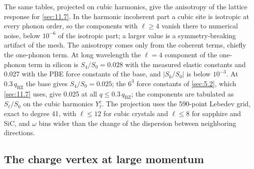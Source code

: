 The same tables, projected on cubic harmonics, give the anisotropy of the lattice response for \cref{sec:11.7}. In the harmonic incoherent part a cubic site is isotropic at every phonon order, so the components with $\ell \ge 4$ vanish there to numerical noise, below $10^{-6}$ of the isotropic part; a larger value is a symmetry-breaking artifact of the mesh. The anisotropy comes only from the coherent terms, chiefly the one-phonon term. At long wavelength the $\ell = 4$ component of the one-phonon term in silicon is $S_4/S_0 = 0.028$ with the measured elastic constants and 0.027 with the PBE force constants of the base, and $|S_6/S_0|$ is below $10^{-3}$. At $0.3\,q_{\mathrm{BZ}}$ the base gives $S_4/S_0 = 0.025$; the $6^3$ force constants of \cref{sec:5.2}, which \cref{sec:11.7} uses, give 0.025 at all $q \le 0.3\,q_{\mathrm{BZ}}$; the components are tabulated as $S_\ell/S_0$ on the cubic harmonics $Y^{\mathrm{c}}_\ell$. The projection uses the 590-point Lebedev grid, exact to degree 41, with $\ell \le 12$ for cubic crystals and $\ell \le 8$ for sapphire and SiC, and $\omega$ bins wider than the change of the dispersion between neighboring directions.

\subsection{The charge vertex at large momentum}

